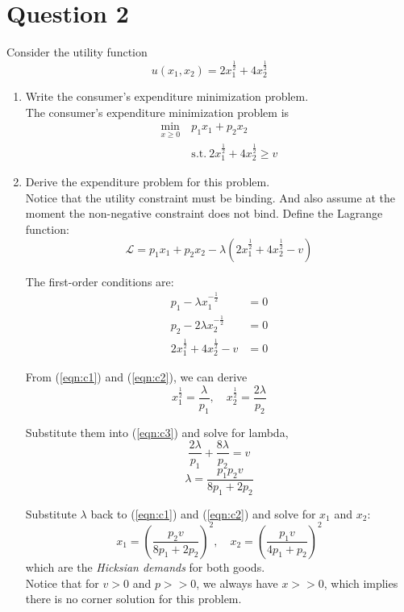 \documentclass{article}
\begin{document}
\section*{Question 2}
Consider the utility function
\[ u(x_1,x_2) = 2x_1^{\frac{1}{2}} + 4x_2^{\frac{1}{2}} \]
\begin{enumerate}
  \item Write the consumer's expenditure minimization problem.\\

  The consumer's expenditure minimization problem is
  \begin{align*}
    \underset{x \geq 0}{\min}\ & p_1x_1 + p_2x_2\quad \\
    &\textrm{s.t.}\ 2x_1^{\frac{1}{2}} + 4x_2^{\frac{1}{2}} \geq v
  \end{align*}

  \item Derive the expenditure problem for this problem.\\

  Notice that the utility constraint must be binding. 
  And also assume at the moment the non-negative constraint does not bind. 
  Define the Lagrange function:
  \[  \mathcal{L} = p_1x_1 + p_2x_2 - \lambda
       (2x_1^{\frac{1}{2}} + 4x_2^{\frac{1}{2}} - v)
  \]

  The first-order conditions are:
  \begin{align}
    p_1 - \lambda x_1^{-\frac{1}{2}} &= 0 \label{eqn:c1} \\
    p_2 - 2\lambda x_2^{-\frac{1}{2}} &= 0 \label{eqn:c2} \\
    2x_1^{\frac{1}{2}} + 4x_2^{\frac{1}{2}} - v &= 0 \label{eqn:c3}
  \end{align}

  From (\ref{eqn:c1}) and (\ref{eqn:c2}), we can derive
  \[ x_1^{\frac{1}{2}} =  \frac{\lambda}{p_1}, \quad
     x_2^{\frac{1}{2}} =  \frac{2\lambda}{p_2} \]

  Substitute them into (\ref{eqn:c3}) and solve for lambda,
  \[ \frac{2\lambda}{p_1} + \frac{8\lambda}{p_2} = v \]
  \[  \lambda = \frac{p_1p_2v}{8p_1 + 2p_2} \]

  Substitute $\lambda$ back to (\ref{eqn:c1}) and (\ref{eqn:c2}) and
  solve for $x_1$ and $x_2$:
  \[ x_1 = \left( \frac{p_2v}{8p_1 + 2p_2} \right)^2, \quad
     x_2 = \left( \frac{p_1v}{4p_1 +  p_2} \right)^2 \]
  which are the \emph{Hicksian demands} for both goods.\\

  Notice that for $v>0$ and $p>>0$, we always have $x>>0$, which implies 
  there is no corner solution for this problem. \\
  

\end{enumerate}
\end{document}
